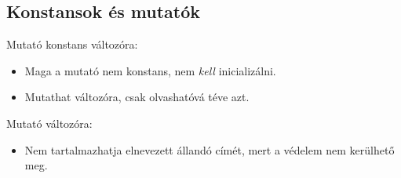 \documentclass[usenames,dvipsnames,aspectratio=169]{beamer}
\begin{document}
\begin{frame}
    \begin{exampleblock}{}
        \scriptsize
        
    \end{exampleblock}
\end{frame}

\begin{frame}
    \begin{exampleblock}{}
        \scriptsize
        
    \end{exampleblock}
\end{frame}


\subsection{Konstansok és mutatók}

\begin{frame}
    Mutató konstans változóra:
    \begin{itemize}
        \item Maga a mutató nem konstans, nem \emph{kell} inicializálni.
        \item Mutathat változóra, csak olvashatóvá téve azt.
    \end{itemize}
    \begin{exampleblock}{}
        \scriptsize
        
    \end{exampleblock}
\end{frame}

\begin{frame}
    Mutató változóra:
    \begin{itemize}
        \item Nem tartalmazhatja elnevezett állandó címét, mert a védelem nem kerülhető meg.
    \end{itemize}
    \begin{exampleblock}{}
        \scriptsize
        
    \end{exampleblock}
\end{frame}
\end{document}
